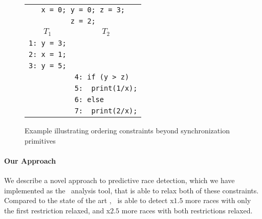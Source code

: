 \begin{figure}
\centering
\begin{tabular}{ll}
\multicolumn{2}{c}{{\tt x = 0; y = 0; z = 3;}} \\
\multicolumn{2}{c}{{\color{red} {\tt z = 2;}}} \\
\hline
\multicolumn{1}{c}{$T_1$} & \multicolumn{1}{c}{$T_2$} \\
\hline
{\tt 1: y = 3;} & \\
{\tt 2: x = 1;} & \\
{\tt 3: y = 5;} & \\
& {\tt 4: if (y > z)} \\
& {\tt 5:~~print(1/x);} \\	
& {\color{red} {\tt 6: else}} \\
& {\color{red} {\tt 7:~~print(2/x);}}
\end{tabular}
\caption{Example illustrating ordering constraints beyond synchronization primitives}
\label{fig:running}
\end{figure}

%
 
 \paragraph{Our Approach} We describe a novel approach to predictive race detection, which we have implemented as the \tool\ analysis tool, that is able to relax both of these constraints. Compared to the state of the art \cite{JEFF}, \tool\ is able to detect x$1.5$ more races with only the first restriction relaxed, and x$2.5$ more races with both restrictions relaxed. 
 
